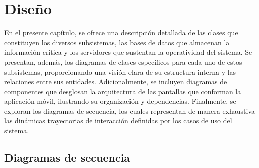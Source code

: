 \chapter{Diseño}

En el presente capítulo, se ofrece una descripción detallada de las clases que constituyen los diversos subsistemas, las bases de datos que almacenan la información crítica y los servidores que sustentan la operatividad del sistema. Se presentan, además, los diagramas de clases específicos para cada uno de estos subsistemas, proporcionando una visión clara de su estructura interna y las relaciones entre sus entidades. Adicionalmente, se incluyen diagramas de componentes que desglosan la arquitectura de las pantallas que conforman la aplicación móvil, ilustrando su organización y dependencias. Finalmente, se exploran los diagramas de secuencia, los cuales representan de manera exhaustiva las dinámicas trayectorias de interacción definidas por los casos de uso del sistema.


















\section{Diagramas de secuencia}

